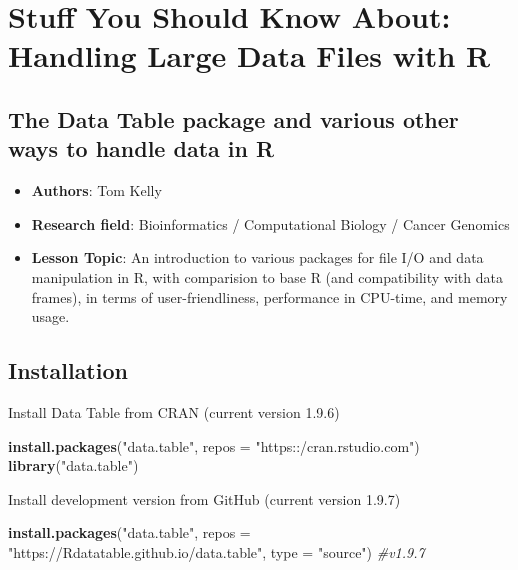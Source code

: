 \documentclass[]{article}
\title{}
\author{}
\date{}
\newenvironment{Shaded}{\begin{snugshade}}{\end{snugshade}}
\newcommand{\KeywordTok}[1]{\textcolor[rgb]{0.13,0.29,0.53}{\textbf{{#1}}}}
\newcommand{\DataTypeTok}[1]{\textcolor[rgb]{0.13,0.29,0.53}{{#1}}}
\newcommand{\StringTok}[1]{\textcolor[rgb]{0.31,0.60,0.02}{{#1}}}
\newcommand{\CommentTok}[1]{\textcolor[rgb]{0.56,0.35,0.01}{\textit{{#1}}}}
\newcommand{\NormalTok}[1]{{#1}}
\providecommand{\tightlist}{%
  \setlength{\itemsep}{0pt}\setlength{\parskip}{0pt}}
\begin{document}
\maketitle

\section{Stuff You Should Know About: Handling Large Data Files with
R}\label{stuff-you-should-know-about-handling-large-data-files-with-r}

\subsection{The Data Table package and various other ways to handle data
in
R}\label{the-data-table-package-and-various-other-ways-to-handle-data-in-r}

\begin{itemize}
\tightlist
\item
  \textbf{Authors}: Tom Kelly
\item
  \textbf{Research field}: Bioinformatics / Computational Biology /
  Cancer Genomics
\item
  \textbf{Lesson Topic}: An introduction to various packages for file
  I/O and data manipulation in R, with comparision to base R (and
  compatibility with data frames), in terms of user-friendliness,
  performance in CPU-time, and memory usage.
\end{itemize}

\subsection{Installation}\label{installation}

Install Data Table from CRAN (current version 1.9.6)

\begin{Shaded}
\begin{Highlighting}[]
\KeywordTok{install.packages}\NormalTok{(}\StringTok{"data.table"}\NormalTok{, }\DataTypeTok{repos =} \StringTok{"https::/cran.rstudio.com"}\NormalTok{)}
\KeywordTok{library}\NormalTok{(}\StringTok{"data.table"}\NormalTok{)}
\end{Highlighting}
\end{Shaded}

Install development version from GitHub (current version 1.9.7)

\begin{Shaded}
\begin{Highlighting}[]
\KeywordTok{install.packages}\NormalTok{(}\StringTok{"data.table"}\NormalTok{, }\DataTypeTok{repos =} \StringTok{"https://Rdatatable.github.io/data.table"}\NormalTok{, }\DataTypeTok{type =} \StringTok{"source"}\NormalTok{) }\CommentTok{#v1.9.7}
\end{Highlighting}
\end{Shaded}
\end{document}
